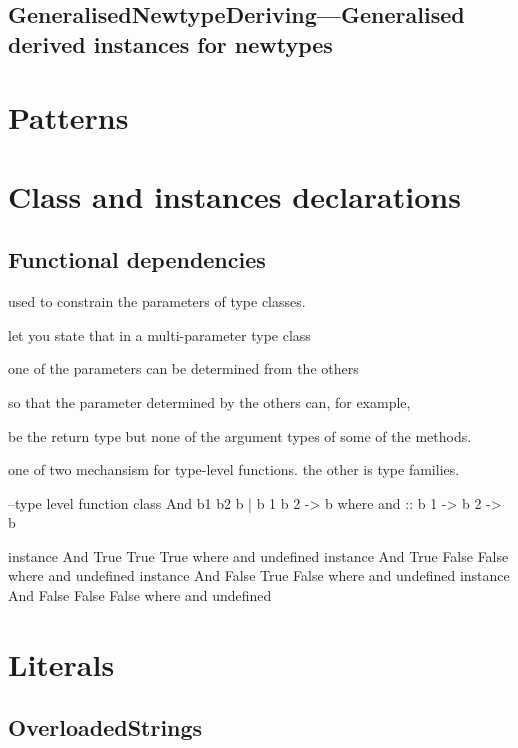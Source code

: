 \documentclass[openany, 12pt]{book}
\begin{document}
\chapter{GeneralisedNewtypeDeriving---Generalised derived instances for newtypes}

\part{Patterns}
\part{Class and instances declarations}

\setcounter{chapter}{6}
\chapter{Functional dependencies}
\begin{alist}
	\item used to constrain the parameters of type classes.
	\item let you state that in a multi-parameter type class
	\item one of the parameters can be determined from the others
	\item so that the parameter determined by the others can, for example,
	\item be the return type but none of the argument types of some of the methods.
	\item one of two mechansism for type-level functions. the other is type
	families.
\end{alist}

\begin{haskell}{}
--type level function
class And b1 b2 b | b 1 b 2 -> b where
    and :: b 1 -> b 2 -> b

instance And True True True    where and undefined
instance And True False False  where and undefined
instance And False True False  where and undefined
instance And False False False where and undefined
\end{haskell}

\part{Literals}
\chapter{OverloadedStrings}
\end{document}
